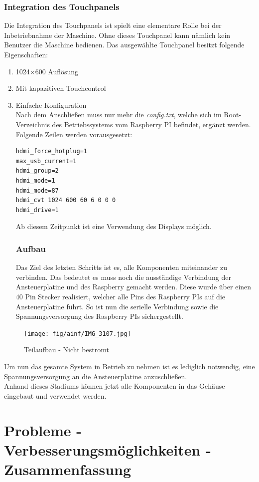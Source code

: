 \subsubsection{Integration des Touchpanels}
Die Integration des Touchpanels ist spielt eine elementare Rolle bei der Inbetriebnahme der Maschine.
Ohne dieses Touchpanel kann nämlich kein Benutzer die Maschine bedienen.
Das ausgewählte Touchpanel besitzt folgende Eigenschaften:
\begin{enumerate}
\item  1024×600 Auflösung
\item Mit kapazitiven Touchcontrol
\item Einfache Konfiguration\\
Nach dem Anschließen muss nur mehr die \textit{config.txt}, welche sich im Root-Verzeichnis des Betriebssystems vom Raspberry PI befindet, ergänzt werden.
Folgende Zeilen werden vorausgesetzt:
\begin{lstlisting}[style=java,caption=Display-Parameter,label=resource]
hdmi_force_hotplug=1
max_usb_current=1
hdmi_group=2
hdmi_mode=1
hdmi_mode=87
hdmi_cvt 1024 600 60 6 0 0 0
hdmi_drive=1
\end{lstlisting}
Ab diesem Zeitpunkt ist eine Verwendung des Displays möglich.
\subsubsection{Aufbau}
Das Ziel des letzten Schritts ist es, alle Komponenten miteinander zu verbinden.
Das bedeutet es muss noch die ausständige Verbindung der Ansteuerplatine und des Raspberry gemacht werden.
Diese wurde über einen 40 Pin Stecker realisiert, welcher alle Pins des Raspberry PIs auf die Ansteuerplatine führt.
So ist nun die serielle Verbindung sowie die Spannungsversorgung des Raspberry PIs sichergestellt.
\end{enumerate}
\begin{figure}[H]
\centering
\texttt{[image: fig/ainf/IMG\_3107.jpg]}
\caption{Teilaufbau - Nicht bestromt}
\label{rpiAndDisplay}
\end{figure}
Um nun das gesamte System in Betrieb zu nehmen ist es lediglich notwendig, eine Spannungsversorgung an die Ansteuerplatine anzuschließen.\\
Anhand dieses Stadiums können jetzt alle Komponenten in das Gehäuse eingebaut und verwendet werden.
\section{Probleme - Verbesserungsmöglichkeiten - Zusammenfassung}

